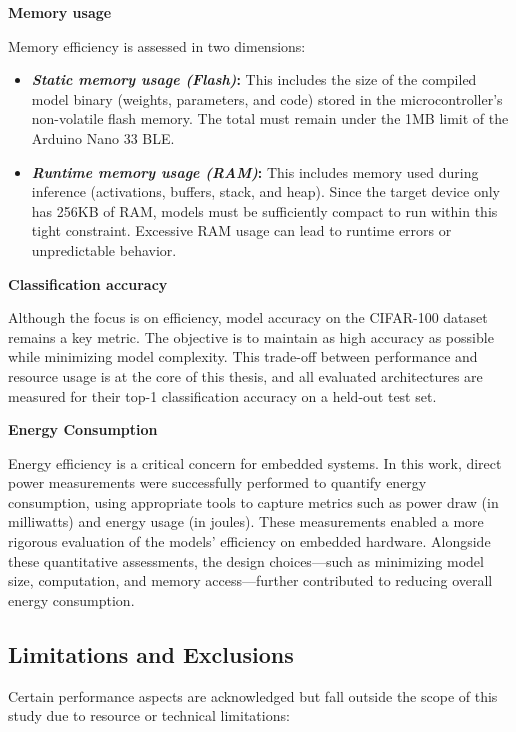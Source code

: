 \textbf{Memory usage}

Memory efficiency is assessed in two dimensions:
\begin{itemize}
    \item \textbf{\textit{Static memory usage (Flash)}:} This includes the size of the compiled model binary (weights, parameters, and code) stored in the microcontroller's non-volatile flash memory. The total must remain under the 1MB limit of the Arduino Nano 33 BLE.

    \item \textbf{\textit{Runtime memory usage (RAM)}:} This includes memory used during inference (activations, buffers, stack, and heap). Since the target device only has 256KB of RAM, models must be sufficiently compact to run within this tight constraint. Excessive RAM usage can lead to runtime errors or unpredictable behavior.
\end{itemize}

\textbf{Classification accuracy}

Although the focus is on efficiency, model accuracy on the CIFAR-100 dataset remains a key metric. The objective is to maintain as high accuracy as possible while minimizing model complexity. This trade-off between performance and resource usage is at the core of this thesis, and all evaluated architectures are measured for their top-1 classification accuracy on a held-out test set.

\textbf{Energy Consumption}

Energy efficiency is a critical concern for embedded systems. In this work, direct power measurements were successfully performed to quantify energy consumption, using appropriate tools to capture metrics such as power draw (in milliwatts) and energy usage (in joules). These measurements enabled a more rigorous evaluation of the models' efficiency on embedded hardware. Alongside these quantitative assessments, the design choices—such as minimizing model size, computation, and memory access—further contributed to reducing overall energy consumption.


\subsection{\textbf{Limitations and Exclusions}}

Certain performance aspects are acknowledged but fall outside the scope of this study due to resource or technical limitations:




